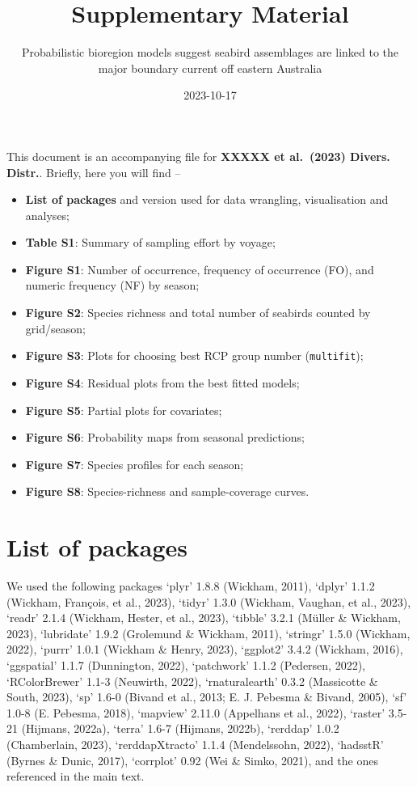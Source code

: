 \documentclass[
]{article}
\title{Supplementary Material}
\subtitle{Probabilistic bioregion models suggest seabird assemblages are
linked to the major boundary current off eastern Australia}
\author{}
\date{\vspace{-2.5em}2023-10-17}
\providecommand{\tightlist}{%
  \setlength{\itemsep}{0pt}\setlength{\parskip}{0pt}}
\begin{document}
\maketitle

This document is an accompanying file for \textbf{XXXXX et al.~(2023)
Divers. Distr.}. Briefly, here you will find --

\begin{itemize}
\tightlist
\item
  \textbf{List of packages} and version used for data wrangling,
  visualisation and analyses;
\item
  \textbf{Table S1}: Summary of sampling effort by voyage;
\item
  \textbf{Figure S1}: Number of occurrence, frequency of occurrence
  (FO), and numeric frequency (NF) by season;
\item
  \textbf{Figure S2}: Species richness and total number of seabirds
  counted by grid/season;
\item
  \textbf{Figure S3}: Plots for choosing best RCP group number
  (\texttt{multifit});
\item
  \textbf{Figure S4}: Residual plots from the best fitted models;
\item
  \textbf{Figure S5}: Partial plots for covariates;
\item
  \textbf{Figure S6}: Probability maps from seasonal predictions;
\item
  \textbf{Figure S7}: Species profiles for each season;
\item
  \textbf{Figure S8}: Species-richness and sample-coverage curves.
\end{itemize}

\newpage

\hypertarget{list-of-packages}{%
\section{List of packages}\label{list-of-packages}}

We used the following packages `plyr' 1.8.8 (Wickham, 2011), `dplyr'
1.1.2 (Wickham, François, et al., 2023), `tidyr' 1.3.0 (Wickham,
Vaughan, et al., 2023), `readr' 2.1.4 (Wickham, Hester, et al., 2023),
`tibble' 3.2.1 (Müller \& Wickham, 2023), `lubridate' 1.9.2 (Grolemund
\& Wickham, 2011), `stringr' 1.5.0 (Wickham, 2022), `purrr' 1.0.1
(Wickham \& Henry, 2023), `ggplot2' 3.4.2 (Wickham, 2016), `ggspatial'
1.1.7 (Dunnington, 2022), `patchwork' 1.1.2 (Pedersen, 2022),
`RColorBrewer' 1.1-3 (Neuwirth, 2022), `rnaturalearth' 0.3.2 (Massicotte
\& South, 2023), `sp' 1.6-0 (Bivand et al., 2013; E. J. Pebesma \&
Bivand, 2005), `sf' 1.0-8 (E. Pebesma, 2018), `mapview' 2.11.0
(Appelhans et al., 2022), `raster' 3.5-21 (Hijmans, 2022a), `terra'
1.6-7 (Hijmans, 2022b), `rerddap' 1.0.2 (Chamberlain, 2023),
`rerddapXtracto' 1.1.4 (Mendelssohn, 2022), `hadsstR' (Byrnes \& Dunic,
2017), `corrplot' 0.92 (Wei \& Simko, 2021), and the ones referenced in
the main text.
\end{document}
